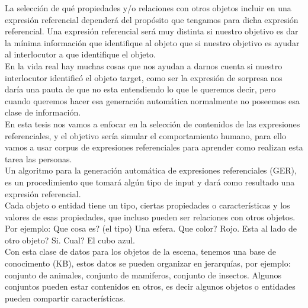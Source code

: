 %
La selecci\'on de qu\'e propiedades y/o relaciones con otros objetos incluir en una expresi\'on referencial depender\'a del prop\'osito que tengamos para dicha expresi\'on referencial. Una expresi\'on referencial ser\'a muy distinta si nuestro objetivo es dar la m\'inima informaci\'on que identifique al objeto que si nuestro objetivo es ayudar al interlocutor a que identifique el objeto.\\

En la vida real hay muchas cosas que nos ayudan a darnos cuenta si nuestro interlocutor identific\'o el objeto target, como ser la expresi\'on de sorpresa nos dar\'ia una pauta de que no esta entendiendo lo que le queremos decir, pero cuando queremos hacer esa generaci\'on autom\'atica normalmente no poseemos esa clase de informaci\'on.\\

En esta tesis nos vamos a enfocar en la selecci\'on de contenidos de las expresiones referenciales, y el objetivo ser\'ia simular el comportamiento humano, para ello vamos a usar corpus de expresiones referenciales para aprender como realizan esta tarea las personas.\\

Un algoritmo para la generaci\'on autom\'atica de expresiones referenciales (GER), es un procedimiento que tomar\'a alg\'un tipo de input y dar\'a como resultado una expresi\'on referencial.\\


Cada objeto o entidad tiene un tipo, ciertas propiedades o caracter\'isticas y los valores de esas propiedades, que incluso pueden ser relaciones con otros objetos. \\

Por ejemplo: Que cosa es? (el tipo) Una esfera. Que color? Rojo. Esta al lado de otro objeto? Si. Cual? El cubo azul.\\

Con esta clase de datos para los objetos de la escena, tenemos una base de conocimento (KB), estos datos se pueden organizar en jerarqu\'ias, por ejemplo: conjunto de animales, conjunto de mamiferos, conjunto de insectos. Algunos conjuntos pueden estar contenidos en otros, es decir algunos objetos o entidades pueden compartir caracter\'isticas.\\

